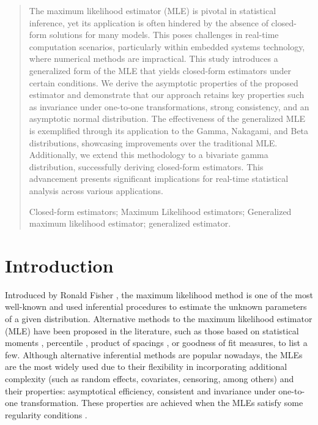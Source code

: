 \documentclass[12pt]{article} %
\theoremstyle{definition}
\begin{document}
\begin{quotation}
The maximum likelihood estimator (MLE) is pivotal in statistical inference, yet its application is often hindered by the absence of closed-form solutions for many models. This poses challenges in real-time computation scenarios, particularly within embedded systems technology, where numerical methods are impractical. This study introduces a generalized form of the MLE that yields closed-form estimators under certain conditions. We derive the asymptotic properties of the proposed estimator and demonstrate that our approach retains key properties such as invariance under one-to-one transformations, strong consistency, and an asymptotic normal distribution. The effectiveness of the generalized MLE is exemplified through its application to the Gamma, Nakagami, and Beta distributions, showcasing improvements over the traditional MLE. Additionally, we extend this methodology to a bivariate gamma distribution, successfully deriving closed-form estimators. This advancement presents significant implications for real-time statistical analysis across various applications.
\par

\vspace{-0.2cm}
Closed-form estimators; Maximum Likelihood estimators; Generalized maximum likelihood estimator; generalized estimator.
\par
\end{quotation}\par



\def\thefigure{\arabic{figure}}
\def\thetable{\arabic{table}}

\renewcommand{\theequation}{\thesection.\arabic{equation}}


\fontsize{12}{14pt plus.8pt minus .6pt}\selectfont

\setcounter{section}{0} %
\setcounter{equation}{0} %


\section{Introduction}


Introduced by Ronald Fisher \citep{aldrich1997ra}, the maximum likelihood method is one of the most well-known and used inferential procedures to estimate the unknown parameters of a given distribution. 
Alternative methods to the maximum likelihood estimator (MLE) have been proposed in the literature, such as those based on statistical moments \citep{hosking1990moments}, percentile \citep{kao1,kao2}, product of spacings \citep{Cheng2}, or goodness of fit measures, to list a few. Although alternative inferential methods are popular nowadays, the MLEs are the most widely used due to their flexibility in incorporating additional complexity (such as random effects, covariates, censoring, among others) and their properties: asymptotical efficiency, consistent and invariance under one-to-one transformation. These properties are achieved when the MLEs satisfy some regularity conditions  \citep{2004-Bierens, 2006-Lehmann,redner1981note}.
\end{document}
